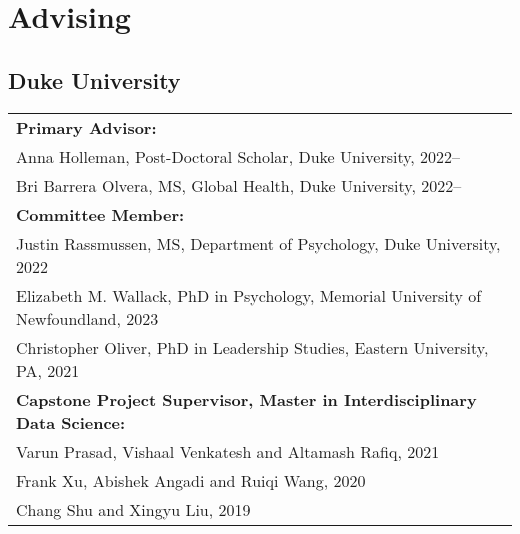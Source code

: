 \section*{Advising}
\subsection*{Duke University}
\begin{tabular}{p{}}
\textbf{Primary Advisor:}\\
Anna Holleman, Post-Doctoral Scholar, Duke University, 2022--\\
Bri Barrera Olvera, MS, Global Health, Duke University, 2022--\\
\textbf{Committee Member:}\\
Justin Rassmussen, MS, Department of Psychology, Duke University, 2022\\
Elizabeth M. Wallack, PhD in Psychology, Memorial University of Newfoundland, 2023\\
Christopher Oliver, PhD in Leadership Studies, Eastern University, PA, 2021\\
\textbf{Capstone Project Supervisor, Master in Interdisciplinary Data Science:}\\
Varun Prasad, Vishaal Venkatesh and Altamash Rafiq, 2021\\
Frank Xu, Abishek Angadi and Ruiqi Wang, 2020\\
Chang Shu and Xingyu Liu, 2019\\
\end{tabular}
